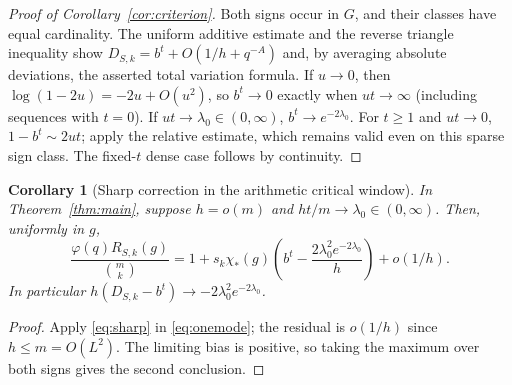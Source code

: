 \documentclass[11pt]{article}
\newtheorem{corollary}[theorem]{Corollary}
\theoremstyle{remark}\newtheorem{remark}[theorem]{Remark}
\newcommand{\normcount}{\frac{\varphi(q)R_{S,k}(g)}{\binom mk}}
\begin{document}
\begin{proof}[Proof of Corollary~\ref{cor:criterion}]
Both signs occur in $G$, and their classes have equal cardinality. The uniform additive estimate and the reverse triangle inequality show $D_{S,k}=b^t+O(1/h+q^{-A})$ and, by averaging absolute deviations, the asserted total variation formula. If $u\to0$, then $\log(1-2u)=-2u+O(u^2)$, so $b^t\to0$ exactly when $ut\to\infty$ (including sequences with $t=0$). If $ut\to\lambda_0\in(0,\infty)$, $b^t\to e^{-2\lambda_0}$. For $t\ge1$ and $ut\to0$, $1-b^t\sim2ut$; apply the relative estimate, which remains valid even on this sparse sign class. The fixed-$t$ dense case follows by continuity.
\end{proof}

\begin{corollary}[Sharp correction in the arithmetic critical window]\label{cor:correction}
In Theorem~\ref{thm:main}, suppose $h=o(m)$ and $ht/m\to\lambda_0\in(0,\infty)$. Then, uniformly in $g$,
\[
 \normcount=1+s_k\chi_*(g)\left(b^t-\frac{2\lambda_0^2e^{-2\lambda_0}}h\right)+o(1/h).
\]
In particular $h(D_{S,k}-b^t)\to-2\lambda_0^2e^{-2\lambda_0}$.
\end{corollary}
\begin{proof}
Apply \eqref{eq:sharp} in \eqref{eq:onemode}; the residual is $o(1/h)$ since $h\le m=O(L^2)$. The limiting bias is positive, so taking the maximum over both signs gives the second conclusion.
\end{proof}
\end{document}
